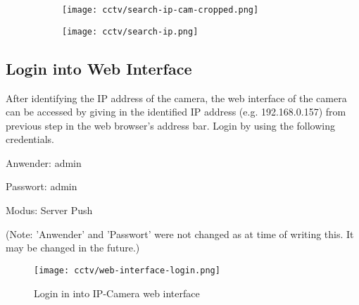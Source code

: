 \begin{figure}[ht]
\caption{SearchIPCam.exe}
\label{search-ip-cam-exe}
\centering
	\begin{subfigure}{.49\linewidth}
	\texttt{[image: cctv/search-ip-cam-cropped.png]}
	\end{subfigure}
	\begin{subfigure}{.49\textwidth}
	\texttt{[image: cctv/search-ip.png]}
	\end{subfigure}
\end{figure}

\subsection{Login into Web Interface}
After identifying the IP address of the camera, the web interface of the camera can be accessed by giving in the identified IP address (e.g. 192.168.0.157) from previous step in the web browser's address bar. Login by using the following credentials.
\begin{itemize*}
\item Anwender: admin
\item Passwort: admin
\item Modus: Server Push
\end{itemize*}
(Note: 'Anwender' and 'Passwort' were not changed as at time of writing this. It may be changed in the future.)

\begin{figure}[ht]
\caption{Login in into IP-Camera web interface}
\label{ip-camera-web-interface}
\centering
\texttt{[image: cctv/web-interface-login.png]}
\end{figure}

